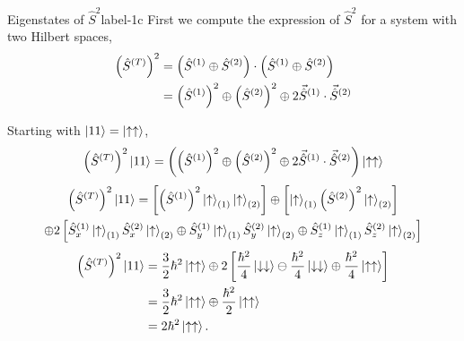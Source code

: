 \documentclass[../main.tex]{subfiles}
\begin{document}
\begin{sol}{Eigenstates of $\hat{S}^{2}$}{label-1c}
    First we compute the expression of $\hat{S}^{2}$ for a system with two Hilbert spaces,
    \begin{align*}
        \qty(\hat{S}^{(T)})^2 &= \qty(\hat{S}^{(1)}\oplus\hat{S}^{(2)})\cdot\qty(\hat{S}^{(1)}\oplus\hat{S}^{(2)}) \\
                          &= \qty(\hat{S}^{(1)})^2 \oplus \qty(\hat{S}^{(2)})^2 \oplus 2 \vec{\hat{S}}^{(1)}\cdot\vec{\hat{S}}^{(2)}
    \end{align*}

    Starting with $\ket{11} = \ket{\uparrow\uparrow}$,
    \begin{align*}
        \qty(\hat{S}^{(T)})^2\ket{11} &= \qty(\qty(\hat{S}^{(1)})^2 \oplus \qty(\hat{S}^{(2)})^2 \oplus 2 \vec{\hat{S}}^{(1)}\cdot\vec{\hat{S}}^{(2)})\ket{\uparrow\uparrow} \\
    \end{align*}
    \begin{multline*}
        \qty(\hat{S}^{(T)})^2\ket{11} = \left[
                                        \qty(\hat{S}^{(1)})^{2}\ket{\uparrow}_{(1)}\ket{\uparrow}_{(2)}
                                     \right]
                                     \oplus
                                     \left[
                                        \ket{\uparrow}_{(1)}\qty(\hat{S}^{(2)})^{2}\ket{\uparrow}_{(2)}
                                     \right]
                                     \\
                                    \oplus
                                    2\left[
                                        \hat{S}_{x}^{(1)}\ket{\uparrow}_{(1)}\hat{S}_{x}^{(2)}\ket{\uparrow}_{(2)} 
                                        \oplus
                                        \hat{S}_{y}^{(1)}\ket{\uparrow}_{(1)}\hat{S}_{y}^{(2)}\ket{\uparrow}_{(2)}
                                        \oplus
                                        \hat{S}_{z}^{(1)}\ket{\uparrow}_{(1)}\hat{S}_{z}^{(2)}\ket{\uparrow}_{(2)}
                                    \right]
    \end{multline*}
    \begin{align*}
        \qty(\hat{S}^{(T)})^2\ket{11} &= \frac{3}{2}\hbar^2\ket{\uparrow\uparrow} \oplus 2\left[\frac{\hbar^2}{4}\ket{\downarrow\downarrow}\ominus\frac{\hbar^2}{4}\ket{\downarrow\downarrow}\oplus\frac{\hbar^2}{4}\ket{\uparrow\uparrow}\right] \\
                                  &= \frac{3}{2}\hbar^2\ket{\uparrow\uparrow} \oplus \frac{\hbar^2}{2}\ket{\uparrow\uparrow} \\
                                  &= 2\hbar^2\ket{\uparrow\uparrow}.
    \end{align*}


\end{sol}
\end{document}
